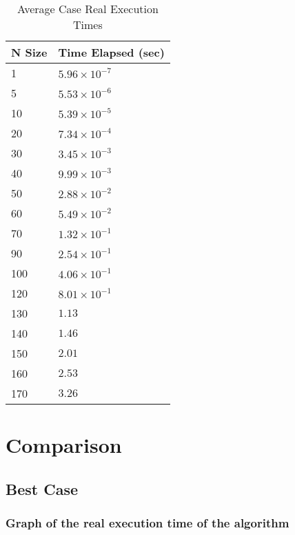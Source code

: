\documentclass[11pt, oneside, a4paper]{article}
\begin{document}
	\begin{table}[H]
		\centering
		\begin{tabular}{|l|l|} \hline
			\textbf{N Size} & \textbf{Time Elapsed (sec)} \\ \hline
			1 & \( 5.96 \times 10^{-7}\) \\ \hline
			5 & \( 5.53 \times 10^{-6}\) \\ \hline
			10 & \( 5.39 \times 10^{-5}\) \\ \hline
			20 & \( 7.34 \times 10^{-4}\) \\ \hline
			30 & \( 3.45 \times 10^{-3}\) \\ \hline
			40 & \( 9.99 \times 10^{-3}\) \\ \hline
			50 & \( 2.88 \times 10^{-2}\) \\ \hline
			60 & \( 5.49 \times 10^{-2}\) \\ \hline
			70 & \( 1.32 \times 10^{-1}\) \\ \hline
			90 & \( 2.54 \times 10^{-1}\) \\ \hline
			100 & \( 4.06 \times 10^{-1}\) \\ \hline
			120 & \( 8.01 \times 10^{-1}\) \\ \hline
			130 & \( 1.13 \) \\ \hline
			140 & \( 1.46 \) \\ \hline
			150 & \( 2.01 \) \\ \hline
			160 & \( 2.53 \) \\ \hline
			170 & \( 3.26 \) \\ \hline
		\end{tabular}
		\caption{Average Case Real Execution Times}
		\label{tab:avg-case}
	\end{table}

	\section{Comparison}

	\subsection{Best Case}

	\subsubsection{Graph of the real execution time of the algorithm}

\end{document}
